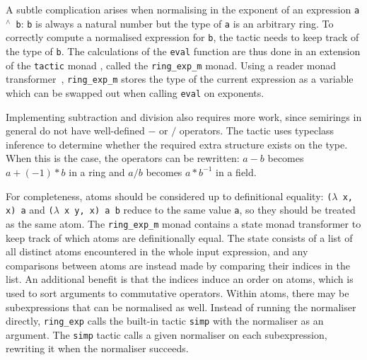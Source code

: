\documentclass{llncs}
\newcommand{\lean}[1]{\texttt{#1}\xspace} %
\newcommand{\pow}{{${}^\wedge$}\xspace}
\newcommand{\ringexp}{\lean{ring\_exp}}
\begin{document}
A subtle complication arises when normalising in the exponent of an expression \lean{a \pow b}:
\lean{b} is always a natural number but the type of \lean{a} is an arbitrary ring.
To correctly compute a normalised expression for \lean{b},
the tactic needs to keep track of the type of \lean{b}.
The calculations of the \lean{eval} function are thus done in an extension of the \lean{tactic} monad%
, called the \lean{ring\_exp\_m} monad.
Using a reader monad transformer~\cite{monad-transformers},
\lean{ring\_exp\_m} stores the type of the current expression
as a variable which can be swapped out when calling \lean{eval} on exponents.

Implementing subtraction and division also requires more work,
since semirings in general do not have well-defined $-$ or $/$ operators.
The tactic uses typeclass inference to determine whether the required extra structure exists on the type.
When this is the case, the operators can be rewritten:
$a - b$ becomes $a + (-1) * b$ in a ring
and $a / b$ becomes $a * b^{-1}$ in a field.

For completeness, atoms should be considered up to definitional equality:
\lean{($\lambda$ x, x) a} and \lean{($\lambda$ x y, x) a b} reduce to the same value \lean{a},
so %
they should be treated as the same atom.
The \lean{ring\_exp\_m} monad contains a state monad transformer to keep track of which atoms are definitionally equal.
The state consists of a list of all distinct atoms encountered in the whole input expression,
and any comparisons between atoms are instead made by comparing their indices in the list.
An additional benefit is that the indices induce an order on atoms, which is used to sort arguments to commutative operators.
Within atoms, there may be subexpressions that can be normalised as well.
Instead of running the normaliser directly, \ringexp calls the built-in tactic \lean{simp} with the normaliser as an argument.
The \lean{simp} tactic calls a given normaliser on each subexpression,
rewriting it when the normaliser succeeds.
\end{document}
